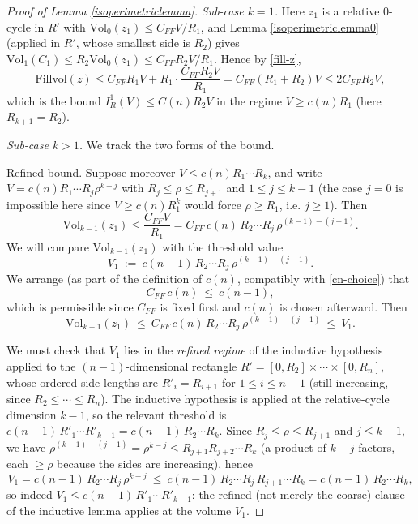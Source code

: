 \documentclass{amsart}
\newtheorem*{theorem 1}{Theorem 1}
\newtheorem*{theorem 2}{Theorem 2}
\newtheorem*{theorem 3}{Theorem 3}
\numberwithin{equation}{section}
\newcommand{\Vol}{\textrm{Vol}}
\begin{document}
\begin{proof} [Proof of Lemma \ref{isoperimetriclemma}]
\emph{Sub-case $k=1$.}  Here $z_1$ is a relative $0$-cycle in
$R'$ with $\Vol_0(z_1) \le C_{FF} V / R_1$, and
Lemma \ref{isoperimetriclemma0} (applied in $R'$, whose smallest
side is $R_2$) gives $\Vol_1(C_1) \le R_2 \Vol_0(z_1) \le
C_{FF} R_2 V / R_1$.  Hence by \eqref{fill-z},
$$ \mathrm{Fillvol}(z) \le C_{FF} R_1 V + R_1 \cdot
   \frac{C_{FF} R_2 V}{R_1} = C_{FF}(R_1 + R_2) V \le 2 C_{FF} R_2 V, $$
which is the bound $I_R^1(V) \le C(n) R_2 V$ in the regime
$V \ge c(n) R_1$ (here $R_{k+1}=R_2$).

\emph{Sub-case $k>1$.}  We track the two forms of the bound.

\underline{Refined bound.}  Suppose moreover $V \le c(n) R_1\cdots
R_k$, and write $V = c(n) R_1 \cdots R_j \rho^{k-j}$ with $R_j \le
\rho \le R_{j+1}$ and $1 \le j \le k-1$ (the case $j=0$ is
impossible here since $V \ge c(n) R_1^k$ would force $\rho \ge
R_1$, i.e. $j\ge 1$).  Then
$$ \Vol_{k-1}(z_1) \le \frac{C_{FF} V}{R_1}
   = C_{FF}\, c(n)\, R_2 \cdots R_j\, \rho^{(k-1)-(j-1)}. $$
We will compare $\Vol_{k-1}(z_1)$ with the threshold value
\begin{equation} \label{V1-def}
 V_1 \ :=\ c(n-1)\, R_2 \cdots R_j\, \rho^{(k-1)-(j-1)} .
\end{equation}
We arrange (as part of the definition of $c(n)$, compatibly with
\eqref{cn-choice}) that
\begin{equation} \label{cn-FF}
 C_{FF}\, c(n) \ \le\ c(n-1),
\end{equation}
which is permissible since $C_{FF}$ is fixed first and $c(n)$ is
chosen afterward.  Then
\begin{equation} \label{slice-le-V1}
 \Vol_{k-1}(z_1) \ \le\ C_{FF}\, c(n)\, R_2 \cdots R_j\,
   \rho^{(k-1)-(j-1)} \ \le\ V_1 .
\end{equation}

We must check that $V_1$ lies in the \emph{refined regime} of the
inductive hypothesis applied to the $(n-1)$-dimensional rectangle
$R' = [0,R_2]\times\cdots\times[0,R_n]$, whose ordered side lengths
are $R'_i = R_{i+1}$ for $1 \le i \le n-1$ (still increasing, since
$R_2 \le \cdots \le R_n$).  The inductive hypothesis is applied at
the relative-cycle dimension $k-1$, so the relevant threshold is
$c(n-1)\,R'_1 \cdots R'_{k-1} = c(n-1)\, R_2 \cdots R_k$.  Since
$R_j \le \rho \le R_{j+1}$ and $j \le k-1$, we have
$\rho^{(k-1)-(j-1)} = \rho^{k-j} \le R_{j+1} R_{j+2} \cdots R_k$
(a product of $k-j$ factors, each $\ge \rho$ because the sides are
increasing), hence
$$ V_1 = c(n-1)\, R_2 \cdots R_j\, \rho^{k-j}
   \ \le\ c(n-1)\, R_2 \cdots R_j\, R_{j+1}\cdots R_k
   = c(n-1)\, R_2 \cdots R_k , $$
so indeed $V_1 \le c(n-1)\, R'_1 \cdots R'_{k-1}$: the refined
(not merely the coarse) clause of the inductive lemma applies at
the volume $V_1$.


\end{proof}
\end{document}

